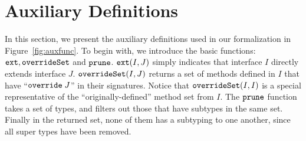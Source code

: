 \section{Auxiliary Definitions}\label{subsec:auxdefs}
In this section, we present the auxiliary definitions used in our formalization in 
Figure~\ref{fig:auxfunc}. To begin with, we
introduce the basic functions: $\texttt{ext}, \texttt{overrideSet}$ and $\texttt{prune}$. $\texttt{ext}(I, J)$
simply indicates that interface $I$ directly extends interface $J$. 
$\texttt{overrideSet}(I, J)$ returns a set of methods defined in $I$ that have ``$\texttt{override} \; J$''
in their signatures. Notice that $\texttt{overrideSet}(I, I)$ is a special representative of
the ``originally-defined'' method set from $I$. The $\texttt{prune}$ function takes a set of
types, and filters out those that have subtypes in the same set. Finally in the returned set,
none of them has a subtyping to one another, since all super types have been removed.


